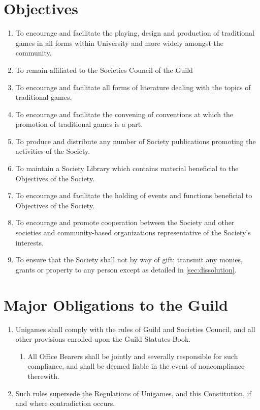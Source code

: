 \documentclass[a4paper]{article}
\begin{document}
\section{Objectives} \label{sec:objectives}
\begin{enumerate}
    \item To encourage and facilitate the playing, design and production of traditional games in all forms within University and more widely amongst the community.
    \item To remain affiliated to the Societies Council of the Guild
    \item To encourage and facilitate all forms of literature dealing with the topics of traditional games.
    \item To encourage and facilitate the convening of conventions at which the promotion of traditional games is a part.
    \item To produce and distribute any number of Society publications promoting the activities of the Society.
    \item To maintain a Society Library which contains material beneficial to the Objectives of the Society.
    \item To encourage and facilitate the holding of events and functions beneficial to Objectives of the Society.
    \item To encourage and promote cooperation between the Society and other societies and community-based organizations representative of the Society's interests.
    \item To ensure that the Society shall not by way of gift; transmit any monies, grants or property to any person except as detailed in \cref{sec:dissolution}.
\end{enumerate}


\section{Major Obligations to the Guild} \label{sec:obligations}
\begin{enumerate}
    \item Unigames shall comply with the rules of Guild and Societies Council, and all other provisions enrolled upon the Guild Statutes Book.
          \begin{enumerate}
              \item All Office Bearers shall be jointly and severally responsible for such compliance, and shall be deemed liable in the event of noncompliance therewith.
          \end{enumerate}
    \item Such rules supersede the Regulations of Unigames, and this Constitution, if and where contradiction occurs.
\end{enumerate}
\end{document}
